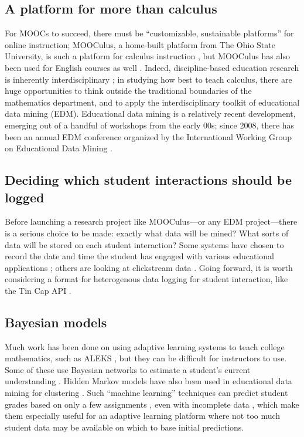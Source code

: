 \documentclass[12pt]{article}
\begin{document}
\subsection{A platform for more than calculus}

For MOOCs to succeed, there must be ``customizable, sustainable
platforms'' \parencite{bowen2013higher} for online instruction;
MOOCulus, a home-built platform from The Ohio State University, is
such a platform for calculus instruction \parencite{evans}, but
MOOCulus has also been used for English courses as
well \parencite{gates-foundation-grant}.  Indeed, discipline-based
education research is inherently interdisciplinary \cite{dber-report};
in studying how best to teach calculus, there are huge opportunities
to think outside the traditional boundaries of the mathematics
department, and to apply the interdisciplinary toolkit of educational
data mining (EDM).  Educational data mining is a relatively recent
development, emerging out of a handful of workshops from the early
00s; since 2008, there has been an annual EDM conference organized by
the International Working Group on Educational Data
Mining \parencite{WIDM:WIDM1075}.

\subsection{Deciding which student interactions should be logged}

Before launching a research project like MOOCulus---or any EDM
project---there is a serious choice to be made: exactly what data will
be mined?  What sorts of data will be stored on each student
interaction?  Some systems have chosen to record the date and time the
student has engaged with various educational
applications \parencite{RomeroZaldivar20121058}; others are looking at
clickstream data \parencite{boyer2013student}.  Going forward, it is
worth considering a format for heterogenous data logging for student
interaction, like the Tin Cap API \parencite{tin-can-api}.

\subsection{Bayesian models}

Much work has been done on using adaptive learning systems to teach
college mathematics, such as ALEKS \parencite{hagerty2005using}, but
they can be difficult for instructors to use.  Some of these use
Bayesian networks to estimate a student's current
understanding \parencite{romero2010educational}.  Hidden Markov models
have also been used in educational data mining for clustering
\parencite{shihdiscovery}.  Such ``machine learning'' techniques can
predict student grades based on only a few
assignments \parencite{predict-grades}, even with incomplete
data \parencite{Zafra201115020}, which make them especially useful for
an adaptive learning platform where not too much student data may be
available on which to base initial predictions.
\end{document}
